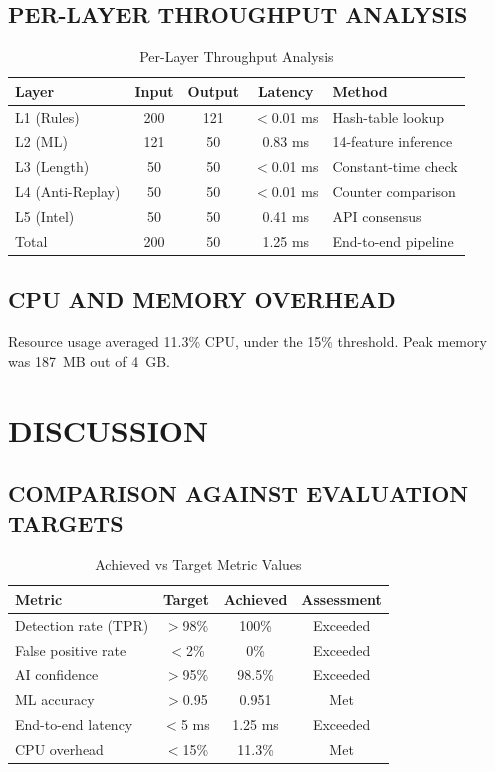 \documentclass[12pt,a4paper]{amritareport}
\begin{document}
\subsection{PER-LAYER THROUGHPUT ANALYSIS}

\begin{table}[H]
\centering
\caption{Per-Layer Throughput Analysis}
\label{tab:throughput}
\small
\begin{tabular}{@{}lcccP{3.6cm}@{}}
\toprule
\textbf{Layer} & \textbf{Input} & \textbf{Output} & \textbf{Latency} & \textbf{Method} \\
\midrule
L1 (Rules) & 200 & 121 & $<$0.01 ms & Hash-table lookup \\
L2 (ML) & 121 & 50 & 0.83 ms & 14-feature inference \\
L3 (Length) & 50 & 50 & $<$0.01 ms & Constant-time check \\
L4 (Anti-Replay) & 50 & 50 & $<$0.01 ms & Counter comparison \\
L5 (Intel) & 50 & 50 & 0.41 ms & API consensus \\
\midrule
Total & 200 & 50 & 1.25 ms & End-to-end pipeline \\
\bottomrule
\end{tabular}
\end{table}

\subsection{CPU AND MEMORY OVERHEAD}

Resource usage averaged 11.3\% CPU, under the 15\% threshold. Peak memory was 187~MB out of 4~GB.

\section{DISCUSSION}

\subsection{COMPARISON AGAINST EVALUATION TARGETS}

\begin{table}[H]
\centering
\caption{Achieved vs Target Metric Values}
\label{tab:targets}
\begin{tabular}{@{}lccc@{}}
\toprule
\textbf{Metric} & \textbf{Target} & \textbf{Achieved} & \textbf{Assessment} \\
\midrule
Detection rate (TPR) & $>$98\% & 100\% & Exceeded \\
False positive rate & $<$2\% & 0\% & Exceeded \\
AI confidence & $>$95\% & 98.5\% & Exceeded \\
ML accuracy & $>$0.95 & 0.951 & Met \\
End-to-end latency & $<$5 ms & 1.25 ms & Exceeded \\
CPU overhead & $<$15\% & 11.3\% & Met \\
\bottomrule
\end{tabular}
\end{table}
\end{document}

